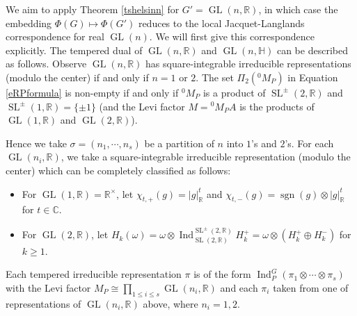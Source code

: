 \documentclass[11pt]{article}
\theoremstyle{plain}
\theoremstyle{remark}
\theoremstyle{definition}
\DeclareMathOperator{\Ind}{Ind}
\DeclareMathOperator{\sgn}{sgn}
\DeclareMathOperator{\SL}{SL}
\DeclareMathOperator{\GL}{GL}
\begin{document}

We aim to apply Theorem \ref{tshelsinn} for $G'=\GL(n,\mathbb{R})$, in which case the embedding $\Phi(G)\mapsto \Phi(G')$ reduces to the local Jacquet-Langlands correspondence for real $\GL(n)$. 
We will first give this correspondence explicitly. 
The tempered dual of $\GL(n,\mathbb{R})$ and $\GL(n,\mathbb{H})$ can be described as follows. 
Observe $\GL(n,\mathbb{R})$ has square-integrable irreducible representations (modulo the center) if and only if $n=1$ or $2$. 
The set $\Pi_2(^{0}{M}_P)$ in Equation \eqref{eRPformula} is non-empty if and only if $^{0}{M}_P$ is a product of $\SL^{\pm}(2,\mathbb{R})$ and $\SL^{\pm}(1,\mathbb{R})=\{\pm 1\}$ (and the Levi factor $M={}^{0}{M}_P A$ is the products of $\GL(1,\mathbb{R})$ and $\GL(2,\mathbb{R})$). 

Hence we take $\sigma=(n_1,\cdots,n_s)$ be a partition of $n$ into $1$'s and $2$'s. 
For each $\GL(n_i,\mathbb{R})$, we take a square-integrable irreducible representation (modulo the center) which can be completely classified as follows: 
\begin{itemize}
    \item For $\GL(1,\mathbb{R})=\mathbb{R}^{\times}$, let $\chi_{t,+}(g)=|g|_{\mathbb{R}}^t$ and $\chi_{t,-}(g)=\sgn(g)\otimes |g|_{\mathbb{R}}^t$ for $t\in\mathbb{C}$.  
    \item For $\GL(2,\mathbb{R})$, let $H_k(\omega)=\omega\otimes \Ind_{\SL(2,\mathbb{R})}^{\SL^{\pm}(2,\mathbb{R})}H_k^+=\omega\otimes(H_k^+\oplus H_k^-)$ for $k\geq 1$. 
\end{itemize}
Each tempered irreducible representation $\pi$ is of the form $\Ind_{P}^{G}(\pi_1\otimes\cdots\otimes \pi_s)$ with the Levi factor $M_P\cong \prod_{1\leq i\leq s}\GL(n_i,\mathbb{R})$ and each $\pi_i$ taken from one of representations of $\GL(n_i,\mathbb{R})$ above, where $n_i=1,2$.  
\end{document}
